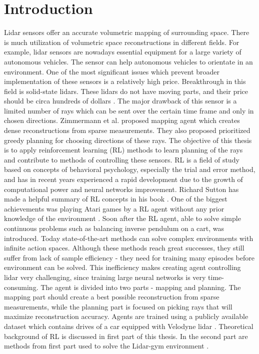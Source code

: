 \section{Introduction}

Lidar sensors offer an accurate volumetric mapping of surrounding space. There is much utilization of volumetric space reconstructions in different fields. For example, lidar sensors are nowadays essential equipment for a large variety of autonomous vehicles. The sensor can help autonomous vehicles to orientate in an environment. One of the most significant issues which prevent broader implementation of these sensors is a relatively high price. Breakthrough in this field is solid-state lidars. These lidars do not have moving parts, and their price should be circa hundreds of dollars \cite{quanergy2016}. The major drawback of this sensor is a limited number of rays which can be sent over the certain time frame and only in chosen directions. Zimmermann et al. \cite{zimmermann2017} proposed mapping agent which creates dense reconstructions from sparse measurements. They also proposed prioritized greedy planning for choosing directions of these rays. The objective of this thesis is to apply reinforcement learning (RL) methods to learn planning of the rays and contribute to methods of controlling these sensors. RL is a field of study based on concepts of behavioral psychology, especially the trial and error method, and has in recent years experienced a rapid development due to the growth of computational power and neural networks improvement. Richard Sutton has made a helpful summary of RL concepts in his book \cite{sutton2012}. One of the biggest achievements was playing Atari games by a RL agent without any prior knowledge of the environment \cite{mnih2015}. Soon after the RL agent, able to solve simple continuous problems such as balancing inverse pendulum on a cart, was introduced. Today state-of-the-art methods can solve complex environments with infinite action spaces. Although these methods reach great successes, they still suffer from lack of sample efficiency - they need for training many episodes before environment can be solved. This inefficiency makes creating agent controlling lidar very challenging, since training large neural networks is very time-consuming. The agent is divided into two parts - mapping and planning. The mapping part should create a best possible reconstruction from sparse measurements, while the planning part is focused on picking rays that will maximize reconstruction accuracy. Agents are trained using a publicly available dataset which contains drives of a car equipped with Velodyne lidar \cite{geiger2013}. Theoretical background of RL is discussed in first part of this thesis. In the second part are methods from first part used to solve the Lidar-gym environment \cite{rozsypalek2018}.
  